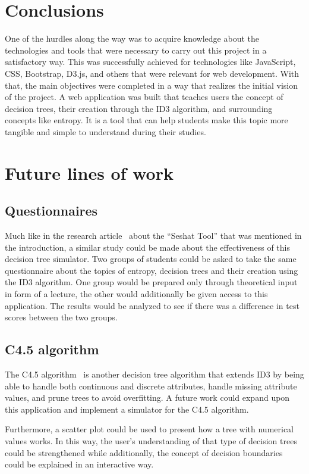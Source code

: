 
\section{Conclusions}
One of the hurdles along the way was to acquire knowledge about the technologies and tools that were necessary to carry out this project in a satisfactory way. This was successfully achieved for technologies like JavaScript, CSS, Bootstrap, D3.js, and others that were relevant for web development.
With that, the main objectives were completed in a way that realizes the initial vision of the project. A web application was built that teaches users the concept of decision trees, their creation through the ID3 algorithm, and surrounding concepts like entropy.
It is a tool that can help students make this topic more tangible and simple to understand during their studies.

\section{Future lines of work}
\subsection{Questionnaires}
Much like in the research article~\cite{https://doi.org/10.1002/cae.22036} about the ``Seshat Tool'' that was mentioned in the introduction, a similar study could be made about the effectiveness of this decision tree simulator. Two groups of students could be asked to take the same questionnaire about the topics of entropy, decision trees and their creation using the ID3 algorithm. One group would be prepared only through theoretical input in form of a lecture, the other would additionally be given access to this application. The results would be analyzed to see if there was a difference in test scores between the two groups.

\subsection{C4.5 algorithm}
The C4.5 algorithm~\cite{c4_5_wiki} is another decision tree algorithm that extends ID3 by being able to handle both continuous and discrete attributes, handle missing attribute values, and prune trees to avoid overfitting. A future work could expand upon this application and implement a simulator for the C4.5 algorithm.

Furthermore, a scatter plot could be used to present how a tree with numerical values works. In this way, the user's understanding of that type of decision trees could be strengthened while additionally, the concept of decision boundaries could be explained in an interactive way.

